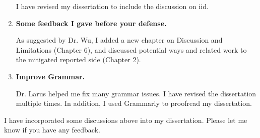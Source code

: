 \documentclass{article}
\begin{document}
\begin{enumerate}
I have revised my dissertation to include the discussion on iid.


\item \textbf{Some feedback I gave before your defense.}

As suggested by Dr. Wu, I added a new chapter on Discussion and Limitations (Chapter 6), and discussed potential ways and related work to the mitigated reported side (Chapter 2).

\item \textbf{Improve Grammar.}

Dr. Larus helped me fix many grammar issues. I have revised the dissertation multiple times. In addition, I used Grammarly to proofread my dissertation.


\end{enumerate}

I have incorporated some discussions above into my dissertation. Please let me know if you have any feedback.
\end{document}
